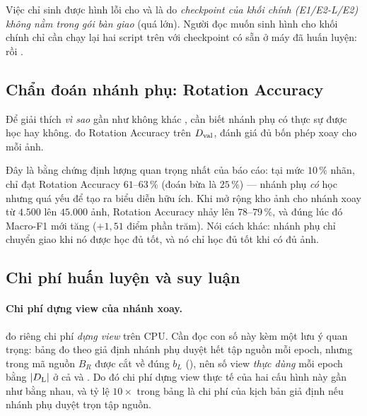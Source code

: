 Việc chỉ sinh được hình lỗi cho  và  là do \emph{checkpoint của khối chính
(E1/E2-L/E2) không nằm trong gói bàn giao} (quá lớn). Người đọc muốn sinh hình cho khối chính chỉ
cần chạy lại hai script trên với checkpoint có sẵn ở máy đã huấn luyện:
 rồi
.

\subsection{Chẩn đoán nhánh phụ: Rotation Accuracy}
\label{sec:results-rotdiag}

Để giải thích \emph{vì sao}  gần như không khác , cần biết nhánh phụ có thực
sự được học hay không.  đo Rotation Accuracy trên $D_{\mathrm{val}}$, đánh giá
đủ bốn phép xoay cho mỗi ảnh.



Đây là bằng chứng định lượng quan trọng nhất của báo cáo: tại mức $10\,\%$ nhãn,  chỉ
đạt Rotation Accuracy $61$--$63\,\%$ (đoán bừa là $25\,\%$) — nhánh phụ \emph{có} học nhưng quá
yếu để tạo ra biểu diễn hữu ích. Khi  mở rộng kho ảnh cho nhánh xoay từ $4.500$ lên
$45.000$ ảnh, Rotation Accuracy nhảy lên $78$--$79\,\%$, và đúng lúc đó Macro-F1 mới tăng
($+1{,}51$ điểm phần trăm). Nói cách khác: nhánh phụ chỉ chuyển giao khi nó được học đủ tốt, và
nó chỉ học đủ tốt khi có đủ ảnh.

\subsection{Chi phí huấn luyện và suy luận}
\label{sec:results-cost}





\paragraph{Chi phí dựng view của nhánh xoay.}
 đo riêng chi phí \emph{dựng view} trên CPU. Cần đọc con số này
kèm một lưu ý quan trọng: bảng đo theo giả định nhánh phụ duyệt hết tập nguồn mỗi epoch, nhưng
trong mã nguồn $B_R$ được cắt về đúng $b_L$ (), nên số view \emph{thực dùng}
mỗi epoch bằng $|D_{\mathrm{L}}|$ ở cả  và . Do đó chi phí dựng view thực tế của hai cấu
hình này gần như bằng nhau, và tỷ lệ $10\times$ trong bảng là chi phí của kịch bản giả định nếu
nhánh phụ duyệt trọn tập nguồn.


